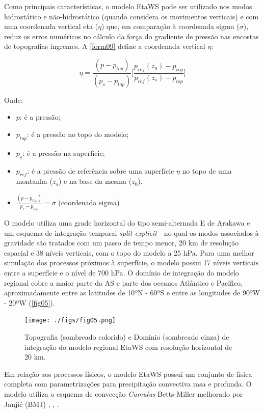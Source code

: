 Como principais características, o modelo EtaWS pode ser utilizado nos modos hidrostático e não-hidrostático (quando considera os movimentos verticais) e com uma coordenada vertical eta ($\eta$) que, em comparação à coordenada sigma ($\sigma$), reduz os erros numéricos no cálculo da força do gradiente de pressão nas encostas de topografias íngremes. A \autoref{form09} define a coordenada vertical $\eta$:

\begin{equation}
\eta=\frac{(p-p_{top})}{(p_{s}-p_{top})}\bigg[\frac{p_{ref}(z_{0})-p_{top}}{p_{ref}(z_{s})-p_{top}}\bigg]
\label{form09}
\end{equation}

Onde:

\begin{itemize}
\item $p$: é a pressão;
\item $p_{top}$: é a pressão no topo do modelo;
\item $p_{s}$: é a pressão na superfície;
\item $p_{ref}$: é a pressão de referência sobre uma superfície $\eta$ no topo de uma montanha ($z_{s}$) e na base da mesma ($z_{0}$).
\item $\frac{(p-p_{top})}{p_{s}-p_{top}}=\sigma$ (coordenada sigma)
\end{itemize}

O modelo utiliza uma grade horizontal do tipo semi-alternada E de Arakawa \cite{arakawalamb77} e um esquema de integração temporal \textit{split-explicit} - no qual os modos associados à gravidade são tratados com um passo de tempo menor, 20 km de resolução espacial e 38 níveis verticais, com o topo do modelo a 25 hPa. Para uma melhor simulação dos processos próximos à superfície, o modelo possui 17 níveis verticais entre a superfície e o nível de 700 hPa. O domínio de integração do modelo regional cobre a maior parte da AS e parte dos oceanos Atlântico e Pacífico, aproximadamente entre as latitudes de 10ºN - 60ºS e entre as longitudes de 90ºW - 20ºW (\autoref{fig05}). 

\begin{figure}[!hbp]
\centering
\texttt{[image: ./figs/fig05.png]}
\caption{Topografia (sombreado colorido) e Domínio (sombreado cinza) de integração do modelo regional EtaWS com resolução horizontal de 20 km.}
\label{fig05}
\end{figure}

Em relação aos processos físicos, o modelo EtaWS possui um conjunto de física completa com parametrizações para precipitação convectiva rasa e profunda. O modelo utiliza o esquema de convecção \textit{Cumulus} Betts-Miller melhorado por Janjić (BMJ) \cite{betts86}, \cite{bettsmiller86}, \cite{janjic94}. 

